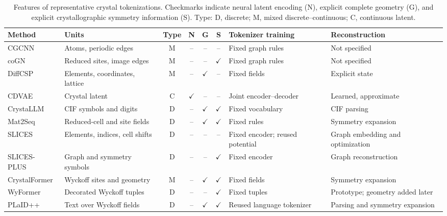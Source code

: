 \begin{table}[H]
\centering
\caption{Features of representative crystal tokenizations. Checkmarks indicate neural latent encoding (N), explicit complete geometry (G), and explicit crystallographic symmetry information (S). Type: D, discrete; M, mixed discrete--continuous; C, continuous latent.}
\label{tab:crystal-tokenization}
\small
\setlength{\tabcolsep}{4pt}
\renewcommand{\arraystretch}{1.17}
\begin{tabularx}{\textwidth}{@{}L{0.16\textwidth}YccccL{0.17\textwidth}L{0.18\textwidth}@{}}
\toprule
Method & Units & Type & N & G & S & Tokenizer training & Reconstruction \\
\midrule
CGCNN~\citep{xie2018cgcnn} & Atoms, periodic edges & M & -- & -- & -- & Fixed graph rules & Not specified \\
coGN~\citep{ruff2024cogn} & Reduced sites, image edges & M & -- & -- & $\checkmark$ & Fixed graph rules & Not specified \\
DiffCSP~\citep{jiao2023diffcsp} & Elements, coordinates, lattice & M & -- & $\checkmark$ & -- & Fixed fields & Explicit state \\
CDVAE~\citep{xie2022cdvae} & Crystal latent & C & $\checkmark$ & -- & -- & Joint encoder--decoder & Learned, approximate \\
CrystaLLM~\citep{antunes2024crystallm} & CIF symbols and digits & D & -- & $\checkmark$ & $\checkmark$ & Fixed vocabulary & CIF parsing \\
Mat2Seq~\citep{yan2024mat2seq} & Reduced-cell and site fields & D & -- & $\checkmark$ & $\checkmark$ & Fixed rules & Symmetry expansion \\
SLICES~\citep{xiao2023slices} & Elements, indices, cell shifts & D & -- & -- & -- & Fixed encoder; reused potential & Graph embedding and optimization \\
SLICES-PLUS~\citep{wang2025slicesplus} & Graph and symmetry symbols & D & -- & -- & $\checkmark$ & Fixed encoder & Graph reconstruction \\
CrystalFormer~\citep{cao2025crystalformer} & Wyckoff sites and geometry & M & -- & $\checkmark$ & $\checkmark$ & Fixed fields & Symmetry expansion \\
WyFormer~\citep{kazeev2025wyformer} & Decorated Wyckoff tuples & D & -- & -- & $\checkmark$ & Fixed tuples & Prototype; geometry added later \\
PLaID++~\citep{xu2026plaidpp} & Text over Wyckoff fields & D & -- & $\checkmark$ & $\checkmark$ & Reused language tokenizer & Parsing and symmetry expansion \\

\end{tabularx}
\end{table}
